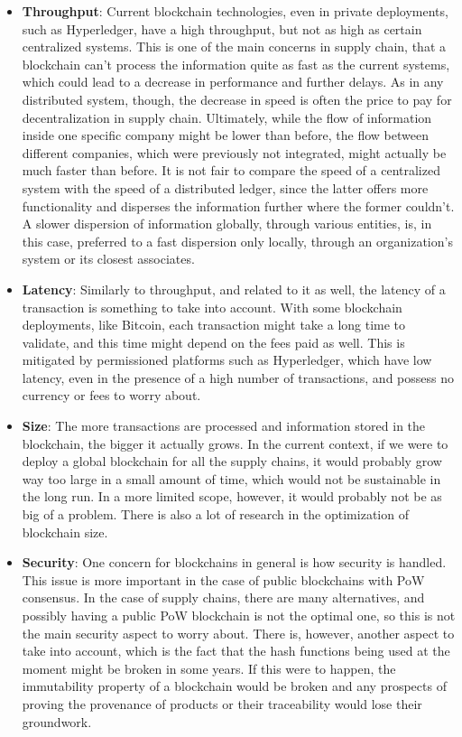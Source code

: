 \begin{itemize}
\item \textbf{Throughput}: Current blockchain technologies, even in private deployments, such as Hyperledger, have a high throughput, but not as high as certain centralized systems. This is one of the main concerns in supply chain, that a blockchain can't process the information quite as fast as the current systems, which could lead to a decrease in performance and further delays. As in any distributed system, though, the decrease in speed is often the price to pay for decentralization in supply chain. Ultimately, while the flow of information inside one specific company might be lower than before, the flow between different companies, which were previously not integrated, might actually be much faster than before. It is not fair to compare the speed of a centralized system with the speed of a distributed ledger, since the latter offers more functionality and disperses the information further where the former couldn't. A slower dispersion of information globally, through various entities, is, in this case, preferred to a fast dispersion only locally, through an organization's system or its closest associates. 
\item \textbf{Latency}: Similarly to throughput, and related to it as well, the latency of a transaction is something to take into account. With some blockchain deployments, like Bitcoin, each transaction might take a long time to validate, and this time might depend on the fees paid as well. This is mitigated by permissioned platforms such as Hyperledger, which have low latency, even in the presence of a high number of transactions, and possess no currency or fees to worry about.
\item \textbf{Size}: The more transactions are processed and information stored in the blockchain, the bigger it actually grows. In the current context, if we were to deploy a global blockchain for all the supply chains, it would probably grow way too large in a small amount of time, which would not be sustainable in the long run. In a more limited scope, however, it would probably not be as big of a problem. There is also a lot of research in the optimization of blockchain size.
\item \textbf{Security}: One concern for blockchains in general is how security is handled. This issue is more important in the case of public blockchains with PoW consensus. In the case of supply chains, there are many alternatives, and possibly having a public PoW blockchain is not the optimal one, so this is not the main security aspect to worry about. There is, however, another aspect to take into account, which is the fact that the hash functions being used at the moment might be broken in some years. If this were to happen, the immutability property of a blockchain would be broken and any prospects of proving the provenance of products or their traceability would lose their groundwork.
\end{itemize}


